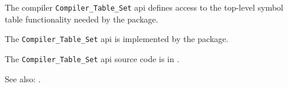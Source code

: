 
The compiler {\tt Compiler\_Table\_Set} api defines access to the top-level 
symbol table functionality needed by the  package.

The {\tt Compiler\_Table\_Set} api is implemented by the  package.

The {\tt Compiler\_Table\_Set} api source code is in .

See also:  .




